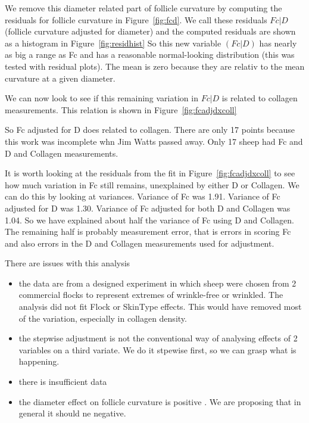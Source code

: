 \documentclass{article}
\begin{document}
\begin{tiny}
 We remove this diameter related part of follicle curvature by computing the residuals for follicle curvature in Figure~\ref{fig:fcd}. We call these residuals $Fc | D$ (follicle curvature adjusted for diameter) and the computed residuals are shown as a histogram in Figure~\ref{fig:residhist} 
So this new variable $(Fc | D)$ has nearly as big a range as Fc and has a reasonable normal-looking distribution (this was tested with residual plots). The mean is zero because they are relativ to the mean curvature at a given diameter.

We can now look to see if this remaining variation in $Fc | D$ is related to collagen measurements. This relation is shown in Figure~\ref{fig:fcadjdxcoll}

So Fc adjusted for D does related to collagen. There are only 17 points because this work was incomplete whn Jim Watts passed away. Only 17 sheep had Fc and D and Collagen measurements.

It is worth looking at the residuals from the fit in Figure~\ref{fig:fcadjdxcoll} to see how much variation in Fc still remains, unexplained by either D or Collagen.  We can do this by looking at variances. Variance of Fc was 1.91. Variance of Fc adjusted for D was 1.30. Variance of Fc adjusted for both D and Collagen was 1.04. So we have explained about half the variance of Fc using D and Collagen. The remaining half is probably measurement error, that is errors in scoring Fc and also errors in the D and Collagen measurements used for adjustment.

There are issues with this analysis
\begin{itemize}
\item the data are from a designed experiment in which sheep were chosen from 2 commercial flocks to represent extremes of wrinkle-free or wrinkled. The analysis did not fit Flock or SkinType effects. This would have removed most of the variation, especially in collagen density. 
\item the stepwise adjustment is not the conventional way of analysing effects of 2 variables on a third variate.  We do it stpewise first, so we can grasp what is happening. 
\item there is insufficient data
\item the diameter effect on follicle curvature is positive . We are proposing that in general it should ne negative.
\end{itemize}


\end{tiny}
\end{document}
